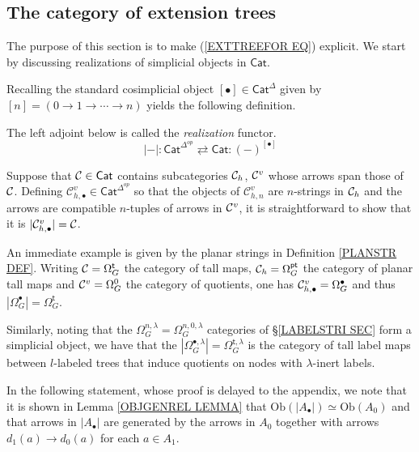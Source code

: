 \documentclass[a4paper,10pt]{article}%
\begin{document}
\subsection{The category of extension trees}
\label{EXTTREE SEC}

The purpose of this section is to make (\ref{EXTTREEFOR EQ}) explicit. We start by discussing 
realizations of simplicial objects in $\mathsf{Cat}$.

Recalling the standard cosimplicial object
$[\bullet] \in \mathsf{Cat}^{\Delta}$ given by 
$[n]=(0 \to 1 \to \cdots \to n)$
yields the following definition.

\begin{definition}\label{REAL DEF}
	The left adjoint below is called the 
	\textit{realization} functor.
	\[
	|\minus|\colon
	\mathsf{Cat}^{\Delta^{op}} 
		\rightleftarrows
	\mathsf{Cat} 
	\colon (\minus)^{[\bullet]}
	\]
\end{definition}

\begin{remark}\label{REALEX REM}
Suppose that $\mathcal{C} \in \mathsf{Cat}$ contains subcategories 
$\mathcal{C}_h$, $\mathcal{C}^v$ whose arrows span those of $\mathcal{C}$.
Defining 
$\mathcal{C}^{v}_{h,\bullet} \in \mathsf{Cat}^{\Delta^{op}}$
so that the objects of $\mathcal{C}^{v}_{h,n}$ are $n$-strings in $\mathcal{C}_h$ and the arrows are compatible $n$-tuples of
arrows in $\mathcal{C}^v$, it is straightforward to show
that it is
$|\mathcal{C}^{v}_{h,\bullet}| = \mathcal{C}$.

An immediate example is given by the planar strings in Definition \ref{PLANSTR DEF}. Writing 
$\mathcal{C} = \Omega_G^{\mathsf{t}}$ the category of tall maps,
$\mathcal{C}_h = \Omega_G^{\mathsf{pt}}$ the category of planar tall maps and
$\mathcal{C}^v = \Omega_G^{0}$ the category of quotients,
one has $\mathcal{C}_{h,\bullet}^{v} = \Omega_G^{\bullet}$ and thus
$|\Omega_G^{\bullet}| = \Omega_G^{\mathsf{t}}$.

Similarly, noting that the $\Omega_G^{n,\lambda} = \Omega_G^{n,0,\lambda}$
categories of \S \ref{LABELSTRI SEC} form a simplicial object, we have that the
$|\Omega_G^{\bullet,\lambda}| = \Omega_G^{\mathsf{t},\lambda}$
is the category of tall label maps between
$l$-labeled trees that induce quotients on 
nodes with $\lambda$-inert labels.
\end{remark}


In the following statement, whose proof is delayed to the appendix, we note that 
it is shown in Lemma \ref{OBJGENREL LEMMA}
that $\text{Ob}(|A_{\bullet}|) \simeq \text{Ob}(A_0)$
and that arrows in $|A_{\bullet}|$ are generated by
the arrows in $A_0$ together with arrows 
$d_1(a) \to d_0(a)$ for each $a \in A_1$.
\end{document}
